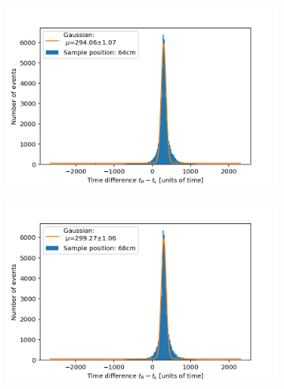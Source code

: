 \documentclass[]{article}
\begin{document}
\begin{figure}[H]
\medskip
\begin{subfigure}{0.48\textwidth}
\includegraphics[width=\linewidth]{Plots/Pos/64cm.png}
\end{subfigure}
\begin{subfigure}[c]{0.48\linewidth}
\includegraphics[width=\linewidth]{Plots/Pos/68cm.png}
\end{subfigure}


\end{figure}
\end{document}
